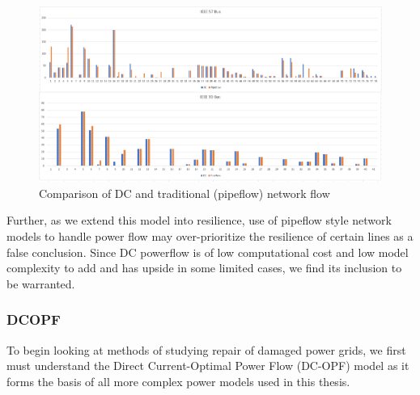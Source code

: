 \documentclass{article}
\begin{document}
	\begin{figure}
		\centering
		\includegraphics[width=\linewidth]{DCvsPipeflow.PNG}
		\caption{Comparison of DC and traditional (pipeflow) network flow}
	\end{figure}
	
	Further, as we extend this model into resilience, use of pipeflow style network models to handle power flow may over-prioritize the resilience of certain lines as a false conclusion. Since DC powerflow is of low computational cost and low model complexity to add and has upside in some limited cases, we find its inclusion to be warranted.
	\subsubsection{DCOPF}
		To begin looking at methods of studying repair of damaged power grids, we first must understand the Direct Current-Optimal Power Flow (DC-OPF) model as it forms the basis of all more complex power models used in this thesis.
		
\end{document}
